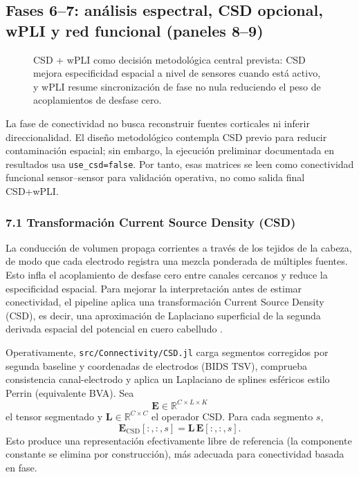 \subsection{Fases 6--7: análisis espectral, CSD opcional, wPLI y red funcional (paneles 8--9)}

\begin{fullwidth}
\begin{figure}[H]
\centering
\resizebox{0.92\fulltextwidth}{!}{\NSCSDWPLI}
\caption{CSD + wPLI como decisión metodológica central prevista: CSD mejora especificidad espacial a nivel de sensores cuando está activo, y wPLI resume sincronización de fase no nula reduciendo el peso de acoplamientos de desfase cero.}
\label{fig:generated-csd-wpli}
\end{figure}
\end{fullwidth}

\begin{decisionmetodologica}
La fase de conectividad no busca reconstruir fuentes corticales ni inferir direccionalidad. El diseño metodológico contempla CSD previo para reducir contaminación espacial; sin embargo, la ejecución preliminar documentada en resultados usa \texttt{use\_csd=false}. Por tanto, esas matrices se leen como conectividad funcional sensor--sensor para validación operativa, no como salida final CSD+wPLI.
\end{decisionmetodologica}

\subsubsection*{7.1 Transformación Current Source Density (CSD)}
La conducción de volumen propaga corrientes a través de los tejidos de la cabeza, de modo que cada electrodo registra una mezcla ponderada de múltiples fuentes. Esto infla el acoplamiento de desfase cero entre canales cercanos y reduce la especificidad espacial. Para mejorar la interpretación antes de estimar conectividad, el pipeline aplica una transformación Current Source Density (CSD), es decir, una aproximación de Laplaciano superficial de la segunda derivada espacial del potencial en cuero cabelludo \citep{Cohen2014}.

Operativamente, \texttt{src/Connectivity/CSD.jl} carga segmentos corregidos por segunda baseline y coordenadas de electrodos (BIDS TSV), comprueba consistencia canal-electrodo y aplica un Laplaciano de splines esféricos estilo Perrin (equivalente BVA). Sea
\[
\mathbf{E}\in\mathbb{R}^{C\times L\times K}
\]
el tensor segmentado y $\mathbf{L}\in\mathbb{R}^{C\times C}$ el operador CSD. Para cada segmento $s$,
\[
\mathbf{E}_{\mathrm{CSD}}[:,:,s]=\mathbf{L}\,\mathbf{E}[:,:,s].
\]
Esto produce una representación efectivamente libre de referencia (la componente constante se elimina por construcción), más adecuada para conectividad basada en fase.

